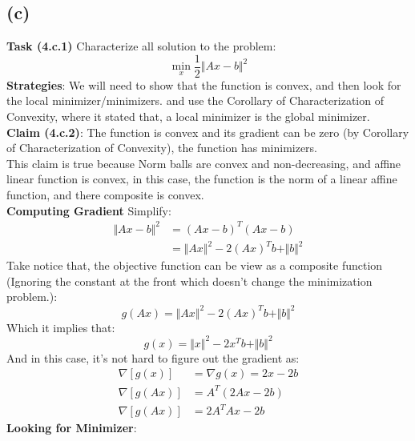 \documentclass[]{article}
\begin{document}
\subsection*{(c)}
    \textbf{Task (4.c.1)} Characterize all solution to the problem: 
    \begin{equation}\tag{4.c.1}\label{eqn:4.c.1}
        \min_{x}\frac{1}{2}\Vert Ax - b\Vert^2
    \end{equation}
    \textbf{Strategies}: We will need to show that the function is convex, and then look for the local minimizer/minimizers. and use the Corollary of Characterization of Convexity, where it stated that, a local minimizer is the global minimizer. 
    \\
    \textbf{Claim (4.c.2)\label{4c2}}: The function is convex and its gradient can be zero (by Corollary of Characterization of Convexity), the function has minimizers. 
    \\
    This claim is true because Norm balls are convex and non-decreasing, and affine linear function is convex, in this case, the function is the norm of a linear affine function, and there composite is convex. 
    \\
    \textbf{Computing Gradient}
    Simplify: 
    \begin{align*}\tag{4.c.3}\label{eqn:4.c.3}
      \Vert Ax - b\Vert^2 &= (Ax - b)^T(Ax - b)
      \\
      &= \Vert Ax\Vert^2 - 2(Ax)^Tb + \Vert b\Vert^2
    \end{align*}
    Take notice that, the objective function can be view as a composite function (Ignoring the constant at the front which doesn't change the minimization problem.): 
    \begin{equation}\tag{4.c.4}\label{eqn:4.c.4}
        g(Ax) = \Vert Ax\Vert^2 - 2(Ax)^Tb + \Vert b\Vert^2
    \end{equation}
    Which it implies that: 
    \begin{equation}\tag{4.c.5}\label{eqn:4.c.5}
        g(x) = \Vert x\Vert^2 - 2x^Tb + \Vert b\Vert^2
    \end{equation}
    And in this case, it's not hard to figure out the gradient as: 
    \begin{align*}\tag{4.c.6}\label{eqn:4.c.6}
        \nabla[g(x)] &= \nabla g(x) = 2x - 2b \\
        \nabla[g(Ax)] &= A^T(2Ax - 2b) \\ 
        \nabla[g(Ax)] &= 2A^TAx - 2b
    \end{align*}
    \textbf{Looking for Minimizer}: 
\end{document}
